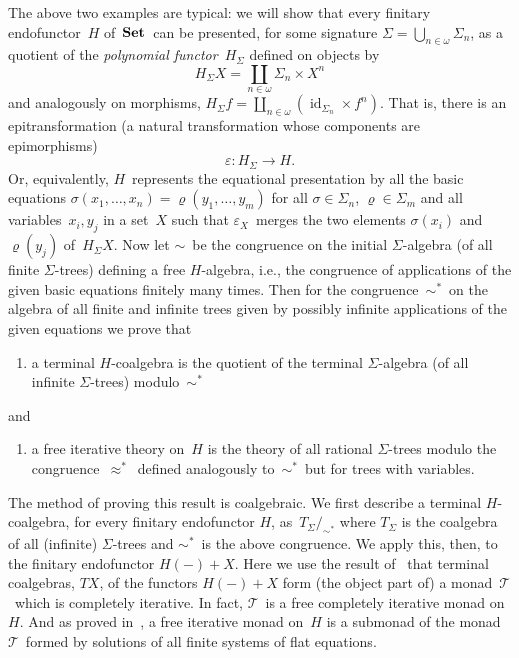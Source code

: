 \documentclass{entcs}
\newcommand{\Set}{\ensuremath{\St}}
\newcommand{\aps}{\ensuremath{\mathrel{\approx^*}}}
\newcommand{\sims}{\ensuremath{\mathrel{\sim^*}}}
\newcommand{\TT}{\ensuremath{\mathscr{T}}}
\DeclareMathOperator{\St}{\textnormal{\textbf{Set}}}
\DeclareMathOperator{\id}{id}
\begin{document}
The above two examples are typical: we will show that every finitary
endofunctor~$H$ of~\Set\ can be presented, for some signature
$\Sigma=\bigcup_{n\in\omega}\Sigma_n$, as a quotient of the
\textit{polynomial functor}~$H_\Sigma$ defined on objects by
\[H_\Sigma X=\coprod_{n\in\omega}\Sigma_n\times X^n\]
and analogously on morphisms, $H_\Sigma f=\coprod_{n\in\omega}
(\id_{\Sigma_n}\times f^n)$. That is, there is an epitransformation
(a natural transformation whose components are epimorphisms)
\[\varepsilon\colon H_\Sigma\to H.\]
Or, equivalently, $H$~represents the equational presentation
by all the basic
equations $\sigma(x_1,\dots,x_n)=\varrho(y_1,\dots,y_m)$ for
all $\sigma\in\Sigma_n$, $\varrho\in\Sigma_m$ and all
variables~$x_i,y_j$ in a set~$X$ such that $\varepsilon_X$~merges
the two elements $\sigma(x_i)$ and~$\varrho(y_j)$ of~$H_\Sigma X$.
Now let $\sim$~be the congruence on the initial $\Sigma$-algebra (of
all finite $\Sigma$-trees) defining a free $H$-algebra, i.e., the
congruence of applications of the given basic equations finitely
many times. Then for the congruence~\sims\ on the algebra of all
finite and infinite trees given by possibly infinite applications of
the given equations we prove that
\begin{enumerate}
\item[(a)]
a terminal $H$-coalgebra is the quotient of the terminal
$\Sigma$-algebra (of all infinite $\Sigma$-trees) modulo~\sims
\end{enumerate}
and
\begin{enumerate}
\item[(b)]
a free iterative theory on~$H$ is the theory of all rational
$\Sigma$-trees modulo the congruence~\aps\ defined analogously
to~\sims\ but for trees with variables.
\end{enumerate}

The method of proving this result is coalgebraic. We first describe
a terminal $H$-coalgebra, for every finitary endofunctor $H$,
as~$T_\Sigma/_{\sims}$
where $T_\Sigma$ is the coalgebra of all (infinite)
$\Sigma$-trees and \sims~is the above congruence. We apply this,
then, to the finitary endofunctor $H({-})+X$. Here
we use the result of~\cite{aamv} that
terminal coalgebras, $TX$, of the functors
$H({-})+X$ form (the object part of) a monad~\TT\
which is completely iterative. In fact, \TT~is a free completely
iterative monad on~$H$. And as proved in~\cite{amv},
a free iterative monad on~$H$ is a submonad of the
monad~\TT\ formed by solutions of all finite systems of flat
equations.
\end{document}
